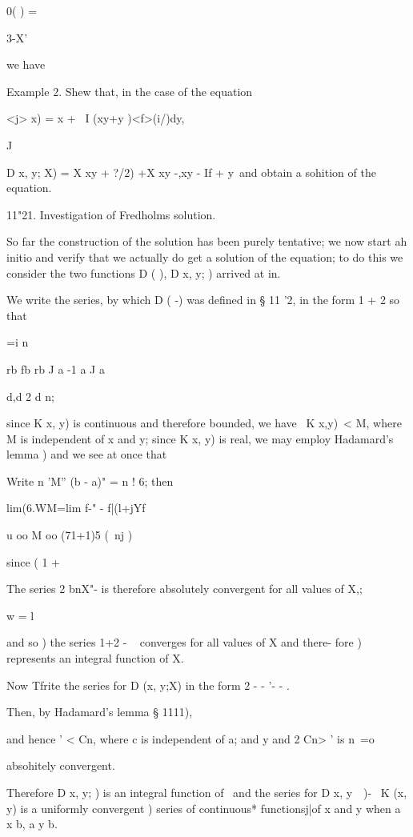 0( ) =

3-X'

we have

Example 2. Shew that, in the case of the equation

<j> x) = x + \ I (xy+y )<f>(i/)dy,

J

D x, y; X) = X xy + ?/2) +X xy -,xy - If + y\ and obtain a sohition
of the equation.

11"21. Investigation of Fredholms solution.

So far the construction of the solution has been purely tentative; we
now start ah initio and verify that we actually do get a solution of
the equation; to do this we consider the two functions D ( ), D x,
y; ) arrived at in.

We write the series, by which D ( -) was defined in § 11 '2, in the
form 1 + 2 so that

 =i n\

rb fb rb J a -1 a J a

d,d 2  d n;

since K x, y) is continuous and therefore bounded, we have \ K x,y)\ <
M, where M is independent of x and y; since K x, y) is real, we may
employ Hadamard's lemma ) and we see at once that

Write n 'M'' (b - a)" = n ! 6; then

lim(6.WM=lim f-" - f|(l+jYf

u oo M oo (71+1)5 (\ nj )

since ( 1 +

The series 2 bnX"- is therefore absolutely convergent for all values
of X,;

w = l

and so ) the series 1+2 - ~ converges for all values of X and
there- fore ) represents an integral function of X.

Now Tfrite the series for D (x, y;X) in the form 2 - - '- - .

%
%

Then, by Hadamard's lemma § 1111),

and hence ' < Cn, where c is independent of a; and y and 2 Cn> ' is n\
=o

absohitely convergent.

Therefore D x, y; ) is an integral function of \ and the series for D
x, y\ \ )- \ K (x, y) is a uniformly convergent ) series of
continuous* functionsj|of x and y when a x b, a y b.

